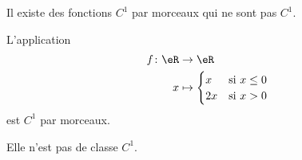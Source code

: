 Il existe des fonctions \( C^1\) par morceaux qui ne sont pas \( C^1\).
\begin{proposition}
	L'application
	\begin{equation}
		\begin{aligned}
			f\colon \eR & \to \eR                         \\
			x           & \mapsto \begin{cases}
				                      x  & \text{si } x\leq 0 \\
				                      2x & \text{si } x>0
			                      \end{cases}
		\end{aligned}
	\end{equation}
	est \( C^1\) par morceaux.

	Elle n'est pas de classe \( C^1\).
\end{proposition}

